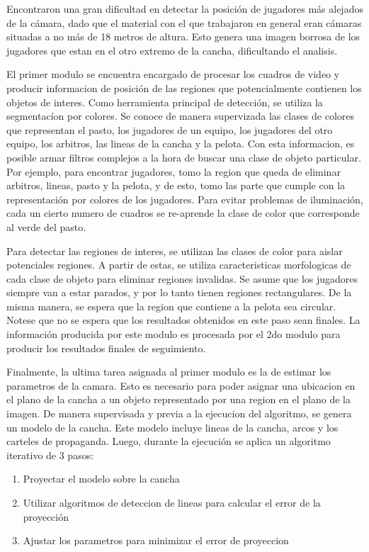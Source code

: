 \documentclass[a4paper,10pt]{article}
\begin{document}
Encontraron una gran dificultad en detectar la posición de jugadores más alejados de la cámara,
dado que el material con el que trabajaron en general eran cámaras situadas a no más de 18
metros de altura. Esto genera una imagen borrosa de los jugadores que estan
en el otro extremo de la cancha, dificultando el analisis.

El primer modulo se encuentra encargado de procesar los cuadros de video y producir informacion
de posición de las regiones que potencialmente contienen los objetos de interes.
Como herramienta principal de detección, se utiliza la segmentacíon por colores.
Se conoce de manera supervizada las clases de colores que representan el pasto, los jugadores de un equipo,
los jugadores del otro equipo, los arbitros, las lineas de la cancha y la pelota.
Con esta informacion, es posible armar filtros complejos a la hora de buscar una clase de objeto particular.
Por ejemplo, para encontrar jugadores, tomo la region que queda de eliminar arbitros, lineas, pasto y la pelota,
y de esto, tomo las parte que cumple con la representación por colores de los jugadores.
Para evitar problemas de iluminación, cada un cierto numero de cuadros se re-aprende la clase de color
que corresponde al verde del pasto.

Para detectar las regiones de interes, se utilizan las clases de color para aislar potenciales regiones.
A partir de estas, se utiliza caracteristicas morfologicas de cada clase de objeto para eliminar regiones
invalidas. Se asume que los jugadores siempre van a estar parados, y por lo tanto tienen regiones rectangulares.
De la misma manera, se espera que la region que contiene a la pelota sea circular.
Notese que no se espera que los resultados obtenidos en este paso sean finales.
La información producida por este modulo es procesada por el 2do modulo para producir los resultados finales de
seguimiento.

Finalmente, la ultima tarea asignada al primer modulo es la de estimar los parametros de la camara.
Esto es necesario para poder asignar una ubicacion en el plano de la cancha a un objeto representado
por una region en el plano de la imagen.
De manera supervisada y previa a la ejecucion del algoritmo, se genera un modelo de la cancha.
Este modelo incluye lineas de la cancha, arcos y los carteles de propaganda.
Luego, durante la ejecución se aplica un algoritmo iterativo de 3 pasos:
\begin{enumerate}
\item Proyectar el modelo sobre la cancha
\item Utilizar algoritmos de deteccion de lineas para calcular el error de la proyección
\item Ajustar los parametros para minimizar el error de proyeccion
\end{enumerate} 
\end{document}
